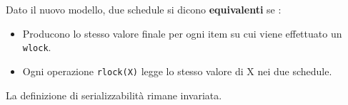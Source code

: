 \documentclass[12pt, letterpaper]{article}
\newcommand{\code}[1]{\colorbox{light-gray}{\texttt{#1}}}
\begin{document}
\begin{figure}[h]
\end{figure}
\newpage Dato il nuovo modello, due schedule si dicono \textbf{equivalenti} se :
\begin{itemize}
    \item Producono lo stesso valore finale per ogni item su cui viene effettuato un \code{wlock}.
    \item Ogni operazione \code{rlock(X)} legge lo stesso valore di X nei due schedule.
\end{itemize}
La definizione di serializzabilità rimane invariata.
\end{document}

